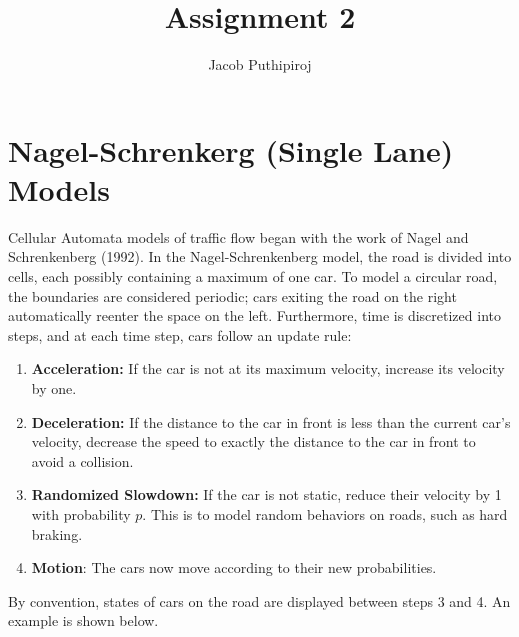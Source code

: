\documentclass{article}
\begin{document}
\title{Assignment 2}
\author{Jacob Puthipiroj}
\maketitle

\makeatletter
\newcommand{\mybox}{%
    \collectbox{%
        \setlength{\fboxsep}{1pt}%
        \fbox{\BOXCONTENT}%
    }%
}


\section*{Nagel-Schrenkerg (Single Lane) Models }


Cellular Automata models of traffic flow began with the work of Nagel and Schrenkenberg (1992). In the Nagel-Schrenkenberg model, the road is divided into cells, each possibly containing a maximum of one car. To model a circular road, the boundaries are considered periodic; cars exiting the road on the right automatically reenter the space on the left. Furthermore, time is discretized into steps, and at each time step, cars follow an update rule:
\begin{enumerate}[itemsep=0.1pt]
\item \textbf{Acceleration:} If the car is not at its maximum velocity, increase its velocity by one.
\item \textbf{Deceleration:} If the distance to the car in front is less than the current car's velocity, decrease the speed to exactly the distance to the car in front to avoid a collision.
\item \textbf{Randomized Slowdown:} If the car is not static, reduce their velocity by 1 with probability $p$. This is to model random behaviors on roads, such as hard braking.
\item \textbf{Motion}: The cars now move according to their new probabilities.
\end{enumerate}
By convention, states of cars on the road are displayed between steps 3 and 4. An example is shown below. 
\end{document}
